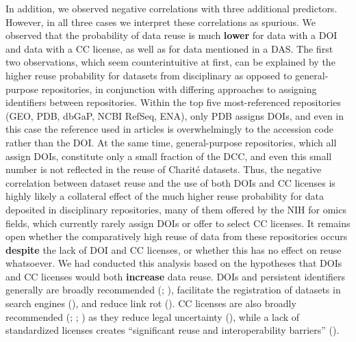 \documentclass[
  letterpaper,
  DIV=11,
  numbers=noendperiod]{scrartcl}
\begin{document}
In addition, we observed negative correlations with three additional
predictors. However, in all three cases we interpret these correlations
as spurious. We observed that the probability of data reuse is much
\textbf{lower} for data with a DOI and data with a CC license, as well
as for data mentioned in a DAS. The first two observations, which seem
counterintuitive at first, can be explained by the higher reuse
probability for datasets from disciplinary as opposed to general-purpose
repositories, in conjunction with differing approaches to assigning
identifiers between repositories. Within the top five most-referenced
repositories (GEO, PDB, dbGaP, NCBI RefSeq, ENA), only PDB assigns DOIs,
and even in this case the reference used in articles is overwhelmingly
to the accession code rather than the DOI. At the same time,
general-purpose repositories, which all assign DOIs, constitute only a
small fraction of the DCC, and even this small num­ber is not reflected
in the reuse of Charité datasets. Thus, the negative correlation between
dataset reuse and the use of both DOIs and CC licenses is highly likely
a collateral effect of the much higher reuse probability for data
deposited in disciplinary repositories, many of them offered by the NIH
for omics fields, which currently rarely assign DOIs or offer to select
CC licenses. It remains open whether the comparatively high reuse of
data from these repositories occurs \textbf{despite} the lack of DOI and
CC licenses, or whether this has no effect on reuse whatsoever. We had
conducted this analysis based on the hypotheses that DOIs and CC
licenses would both \textbf{increase} data reuse. DOIs and persistent
identifiers generally are broadly recommended
(;
), facilitate the registration of datasets
in search engines (), and reduce link rot
(). CC licenses
are also broadly recommended
(;
; ) as they reduce legal uncertainty
(), while a lack of standardized licenses creates ``significant
reuse and interoperability barriers''
().
\end{document}
